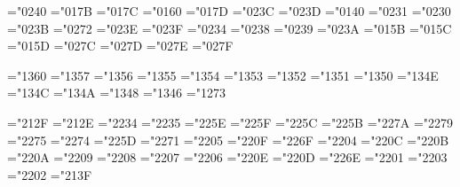 \mathchardef\aleph="0240
\def\hbar{{\mathchar'26\mkern-9muh}}
\mathchardef\imath="017B
\mathchardef\jmath="017C
\mathchardef\ell="0160
\mathchardef\wp="017D
\mathchardef\Re="023C
\mathchardef\Im="023D
\mathchardef\partial="0140
\mathchardef\infty="0231
\mathchardef\prime="0230
\mathchardef\emptyset="023B
\mathchardef\nabla="0272
\def\surd{{\mathchar"1270}}
\mathchardef\top="023E
\mathchardef\bot="023F
\def\angle{{\vbox{\ialign{$\m@th\scriptstyle##$\crcr
      \not\mathrel{\mkern14mu}\crcr
      \noalign{\nointerlineskip}
      \mkern2.5mu\leaders\hrule height.34pt\hfill\mkern2.5mu\crcr}}}}
\mathchardef\triangle="0234
\mathchardef\forall="0238
\mathchardef\exists="0239
\mathchardef\neg="023A \let\lnot=\neg
\mathchardef\flat="015B
\mathchardef\natural="015C
\mathchardef\sharp="015D
\mathchardef\clubsuit="027C
\mathchardef\diamondsuit="027D
\mathchardef\heartsuit="027E
\mathchardef\spadesuit="027F

\mathchardef\coprod="1360
\mathchardef\bigvee="1357
\mathchardef\bigwedge="1356
\mathchardef\biguplus="1355
\mathchardef\bigcap="1354
\mathchardef\bigcup="1353
\mathchardef\intop="1352 \def\int{\intop\nolimits}
\mathchardef\prod="1351
\mathchardef\sum="1350
\mathchardef\bigotimes="134E
\mathchardef\bigoplus="134C
\mathchardef\bigodot="134A
\mathchardef\ointop="1348 \def\oint{\ointop\nolimits}
\mathchardef\bigsqcup="1346
\mathchardef\smallint="1273

\mathchardef\triangleleft="212F
\mathchardef\triangleright="212E
\mathchardef\bigtriangleup="2234
\mathchardef\bigtriangledown="2235
\mathchardef\wedge="225E \let\land=\wedge
\mathchardef\vee="225F \let\lor=\vee
\mathchardef\cap="225C
\mathchardef\cup="225B
\mathchardef\ddagger="227A
\mathchardef\dagger="2279
\mathchardef\sqcap="2275
\mathchardef\sqcup="2274
\mathchardef\uplus="225D
\mathchardef\amalg="2271
\mathchardef\diamond="2205
\mathchardef\bullet="220F
\mathchardef\wr="226F
\mathchardef\div="2204
\mathchardef\odot="220C
\mathchardef\oslash="220B
\mathchardef\otimes="220A
\mathchardef\ominus="2209
\mathchardef\oplus="2208
\mathchardef\mp="2207
\mathchardef\pm="2206
\mathchardef\circ="220E
\mathchardef\bigcirc="220D
\mathchardef\setminus="226E %
\mathchardef\cdot="2201
\mathchardef\ast="2203
\mathchardef\times="2202
\mathchardef\star="213F

